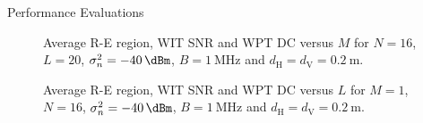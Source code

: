 \documentclass[journal,12pt,onecolumn,draftclsnofoot]{IEEEtran}
\begin{document}
\begin{section}{Performance Evaluations}
		\begin{figure}[!t]
			\centering
			\caption{Average R-E region, WIT SNR and WPT DC versus $M$ for $N=16$, $L=20$, $\sigma_n^2=\SI{-40}{\dBm}$, $B=\SI{1}{\MHz}$ and $d_{\mathrm{H}}=d_{\mathrm{V}}=\SI{0.2}{\meter}$.}
		\end{figure}

		\begin{figure}[!t]
			\centering
			\caption{Average R-E region, WIT SNR and WPT DC versus $L$ for $M=1$, $N=16$, $\sigma_n^2=\SI{-40}{\dBm}$, $B=\SI{1}{\MHz}$ and $d_{\mathrm{H}}=d_{\mathrm{V}}=\SI{0.2}{\meter}$.}
		\end{figure}


\end{section}
\end{document}
